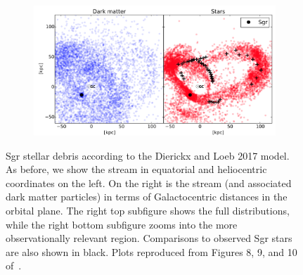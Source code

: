 \begin{figure}
\begin{subfigure}{0.52\textwidth}
        \includegraphics[width=\textwidth]{figs/dierickx2017-9.png}
    \end{subfigure}

    \caption{%
        Sgr stellar debris according to the Dierickx and Loeb 2017 model. As
        before, we show the stream in equatorial and heliocentric coordinates
        on the left. On the right is the stream (and associated dark matter
        particles) in terms of Galactocentric distances in the orbital plane.
        The right top subfigure shows the full distributions, while the right
        bottom subfigure zooms into the more observationally relevant region.
        Comparisons to observed Sgr stars are also shown in black. Plots
        reproduced from Figures 8, 9, and 10
        of~\cite{dierickx_predicted_2017}.
    }
    \label{fig:dierickx}
\end{figure}
